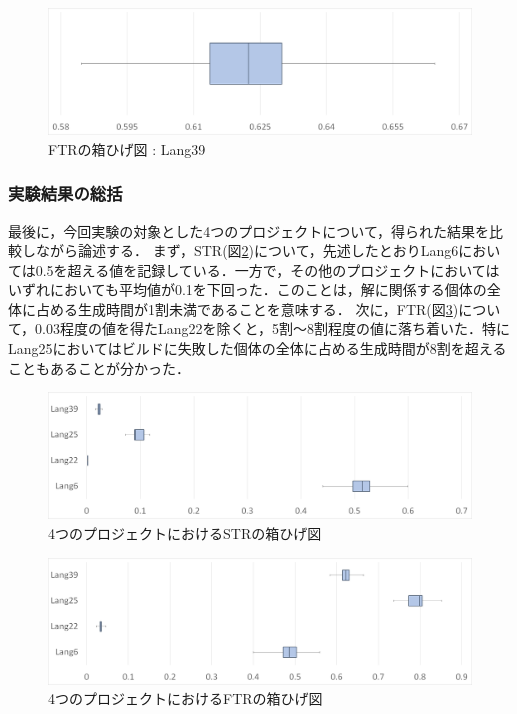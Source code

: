 \documentclass[uplatex,dvipdfmx,a4paper]{jsarticle}
\begin{document}
\begin{figure}[t]
  \centering
  \includegraphics[width=\linewidth]{fig/Lang39_boxplot_FTR.png}
  \caption{FTRの箱ひげ図 : Lang39}
  \label{fig:Lang39_boxplot_FTR}
\end{figure}
\subsubsection{実験結果の総括}
最後に，今回実験の対象とした4つのプロジェクトについて，得られた結果を比較しながら論述する．
まず，STR(図\ref{fig:summary_STR})について，先述したとおりLang6においては0.5を超える値を記録している．一方で，その他のプロジェクトにおいてはいずれにおいても平均値が0.1を下回った．このことは，解に関係する個体の全体に占める生成時間が1割未満であることを意味する．
次に，FTR(図\ref{fig:summary_FTR})について，0.03程度の値を得たLang22を除くと，5割～8割程度の値に落ち着いた．特にLang25においてはビルドに失敗した個体の全体に占める生成時間が8割を超えることもあることが分かった．
\begin{figure}[t]
  \centering
  \includegraphics[width=\linewidth]{fig/summary_STR.png}
  \caption{4つのプロジェクトにおけるSTRの箱ひげ図}
  \label{fig:summary_STR}
\end{figure}
\begin{figure}[t]
  \centering
  \includegraphics[width=\linewidth]{fig/summary_FTR.png}
  \caption{4つのプロジェクトにおけるFTRの箱ひげ図}
  \label{fig:summary_FTR}
\end{figure}
\clearpage
\end{document}
